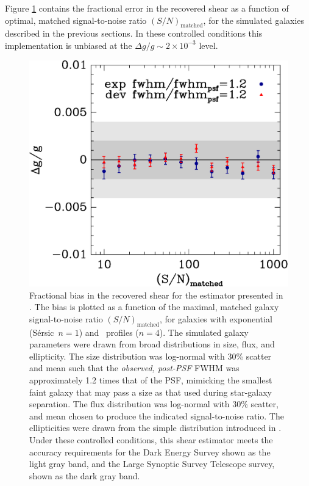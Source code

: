 \documentclass[12pt,preprint]{aastex}
\newcommand{\Msn}{$(S/N)_{\textrm{matched}}$}
\newcommand{\sersic}{S\'{e}rsic}
\newcommand{\lognormscatt}{30}
\begin{document}
Figure \ref{fig:fracerr} contains the fractional error in the recovered shear
as a function of optimal, matched signal-to-noise ratio \Msn, for the simulated
galaxies described in the previous sections.  In these controlled conditions
this implementation is unbiased at the $\Delta g/g \sim 2\times 10^{-3}$ level.

\begin{figure}[p] \centering
 \centering 
 \includegraphics[scale=0.8]{figures/ngmix-fwhm1.2.eps}

 \caption{ Fractional bias in the recovered shear for the estimator presented
     in \cite{ba14}.  The bias is plotted as a function of the maximal, matched
     galaxy signal-to-noise ratio \Msn, for galaxies with exponential (\sersic\
     $n=1$) and \devauc\ profiles ($n=4$).  The simulated galaxy parameters
     were drawn from broad distributions in size, flux, and ellipticity.  The
     size distribution was log-normal with \lognormscatt\% scatter and mean
     such that the {\it observed, post-PSF} FWHM was approximately 1.2 times
     that of the PSF, mimicking the smallest faint galaxy that may pass a size
     as that used during star-galaxy separation.  The flux distribution was
     log-normal with \lognormscatt\% scatter, and mean chosen to produce the
     indicated signal-to-noise ratio.  The ellipticities were drawn from the
     simple distribution introduced in \cite{ba14}. Under these controlled
     conditions, this shear estimator meets the accuracy requirements for the
 Dark Energy Survey shown as the light gray band, and the Large Synoptic Survey
 Telescope survey, shown as the dark gray band.  \label{fig:fracerr}}

\end{figure}
\end{document}
